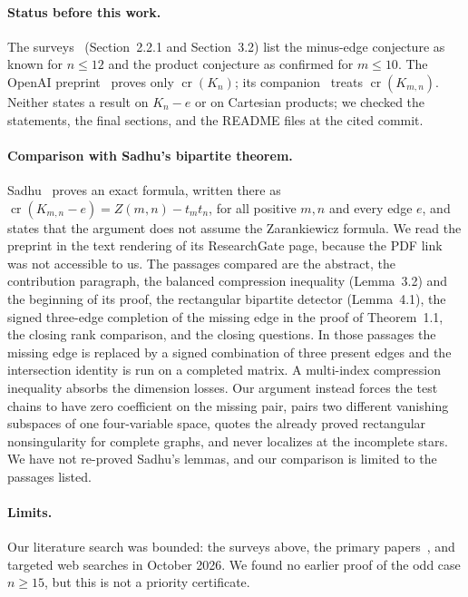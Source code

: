 \documentclass[11pt,a4paper]{article}
\theoremstyle{definition}
\theoremstyle{remark}
\numberwithin{equation}{section}
\newcommand{\crn}{\operatorname{cr}}
\begin{document}
\paragraph{Status before this work.} The surveys~\cite{CHN} (Section~2.2.1 and Section~3.2) list the minus-edge conjecture as known for $n\le12$ and the product conjecture as confirmed for $m\le10$. The OpenAI preprint~\cite{OAIKn} proves only $\crn(K_n)$; its companion~\cite{OAIKmn} treats $\crn(K_{m,n})$. Neither states a result on $K_n-e$ or on Cartesian products; we checked the statements, the final sections, and the README files at the cited commit.

\paragraph{Comparison with Sadhu's bipartite theorem.} Sadhu~\cite[Theorem~1.1]{Sadhu} proves an exact formula, written there as $\crn(K_{m,n}-e)=Z(m,n)-t_mt_n$, for all positive $m,n$ and every edge $e$, and states that the argument does not assume the Zarankiewicz formula. We read the preprint in the text rendering of its ResearchGate page, because the PDF link was not accessible to us. The passages compared are the abstract, the contribution paragraph, the balanced compression inequality (Lemma~3.2) and the beginning of its proof, the rectangular bipartite detector (Lemma~4.1), the signed three-edge completion of the missing edge in the proof of Theorem~1.1, the closing rank comparison, and the closing questions. In those passages the missing edge is replaced by a signed combination of three present edges and the intersection identity is run on a completed matrix. A multi-index compression inequality absorbs the dimension losses. Our argument instead forces the test chains to have zero coefficient on the missing pair, pairs two different vanishing subspaces of one four-variable space, quotes the already proved rectangular nonsingularity for complete graphs, and never localizes at the incomplete stars. We have not re-proved Sadhu's lemmas, and our comparison is limited to the passages listed.

\paragraph{Limits.} Our literature search was bounded: the surveys above, the primary papers~\cite{OWH,ChiaLee,Asiri}, and targeted web searches in October 2026. We found no earlier proof of the odd case $n\ge15$, but this is not a priority certificate.
\end{document}
